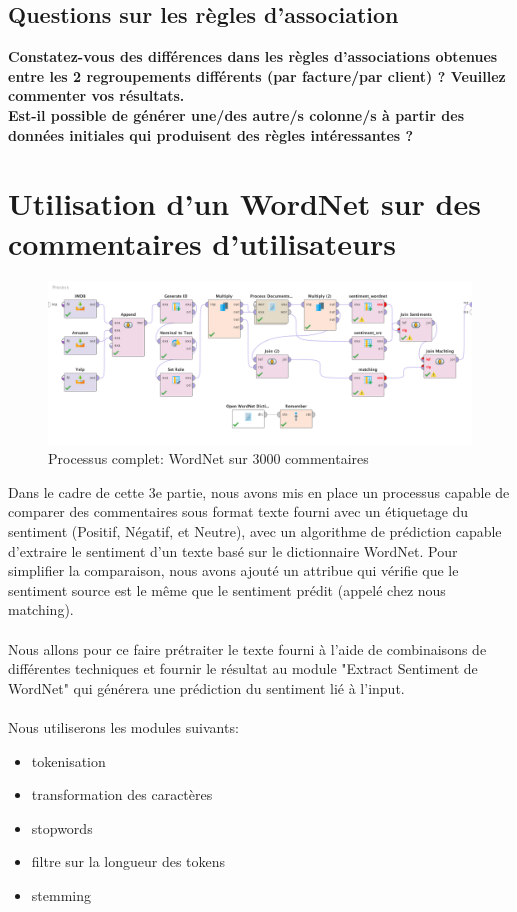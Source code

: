 \documentclass[a4paper]{article}
\begin{document}
\subsection{Questions sur les règles d’association}
\textbf{Constatez-vous des différences dans les règles d'associations obtenues entre les 2 regroupements différents (par facture/par client) ? Veuillez commenter vos résultats.}
\\

\vspace{6pt}
\textbf{Est-il possible de générer une/des autre/s colonne/s à partir des données initiales qui produisent des règles intéressantes ?}
\\

\vspace{6pt}

\pagebreak
\section{Utilisation d'un WordNet sur des commentaires d’utilisateurs}

\begin{figure}[H]
	\includegraphics[width=\linewidth]{imgs/part_3/3_full_process}
	\caption{Processus complet: WordNet sur 3000 commentaires }
	\label{fig:3_full_process}
\end{figure}

Dans le cadre de cette 3e partie, nous avons mis en place un processus capable de comparer des commentaires sous format texte fourni avec un étiquetage du sentiment (Positif, Négatif, et Neutre), avec un algorithme de prédiction capable d'extraire le sentiment d'un texte basé sur le dictionnaire WordNet. Pour simplifier la comparaison, nous avons ajouté un attribue qui vérifie que le sentiment source est le même que le sentiment prédit (appelé chez nous matching).
\\\\
Nous allons pour ce faire prétraiter le texte fourni à l'aide de combinaisons de différentes techniques et fournir le résultat au module "Extract Sentiment de WordNet" qui générera une prédiction du sentiment lié à l'input.
\\\\
Nous utiliserons les modules suivants:
\begin{itemize}
	\item tokenisation
	\item transformation des caractères
	\item stopwords
	\item filtre sur la longueur des tokens
	\item stemming
\end{itemize}
\end{document}
